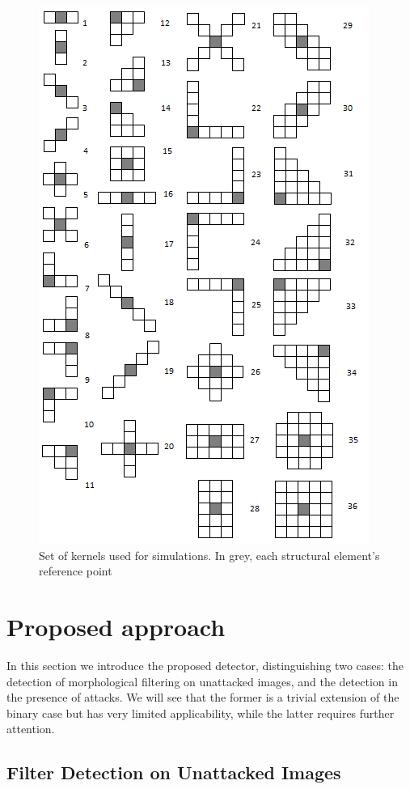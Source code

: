 \documentclass[review]{elsarticle}
\begin{document}
\begin{figure}[!ht]
	\centering
	\includegraphics[scale=0.6]{masks.png}
	\caption{Set of kernels used for simulations. In grey, each structural element's reference point}
	\label{fig:masks}
\end{figure}

\section{Proposed approach}
In this section we introduce the proposed detector, distinguishing two cases: the detection of morphological filtering on unattacked images, and the detection in the presence of attacks. We will see that the former is a trivial extension of the binary case but has very limited applicability, while the latter requires further attention.

\subsection{Filter Detection on Unattacked Images}
\end{document}
